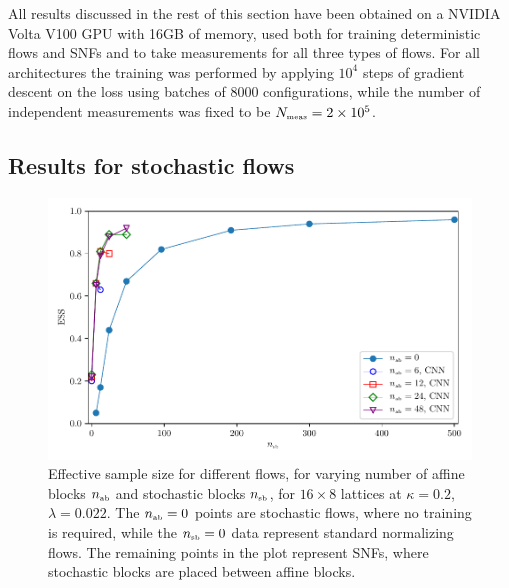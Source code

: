 \documentclass[11pt]{article}
\newcommand{\nab}{n_{\mbox{\tiny{ab}}}}
\newcommand{\nsb}{n_{\mbox{\tiny{sb}}}}
\newcommand{\nmeas}{N_{\mbox{\tiny{meas}}}}
\begin{document}
All results discussed in the rest of this section have been obtained on a NVIDIA Volta V100 GPU with 16GB of memory, used both for training deterministic flows and SNFs and to take measurements for all three types of flows. For all architectures the training was performed by applying $10^4$ steps of gradient descent on the loss using batches of $8000$ configurations, while the number of independent measurements was fixed to be $\nmeas=2\times 10^5$.

\subsection{Results for stochastic flows}

\begin{figure}[!htb]
\begin{center}
\includegraphics*[width=\textwidth]{ESS.pdf}
\caption{Effective sample size for different flows, for varying number of affine blocks $\nab$ and stochastic blocks $\nsb$, for $16\times8$ lattices at $\kappa=0.2$, $\lambda=0.022$. The $\nab=0$ points are stochastic flows, where no training is required, while the $\nsb=0$ data represent standard normalizing flows. The remaining points in the plot represent SNFs, where stochastic blocks are placed between affine blocks.\label{fig:ESS}}
\end{center}
\end{figure}
\end{document}
